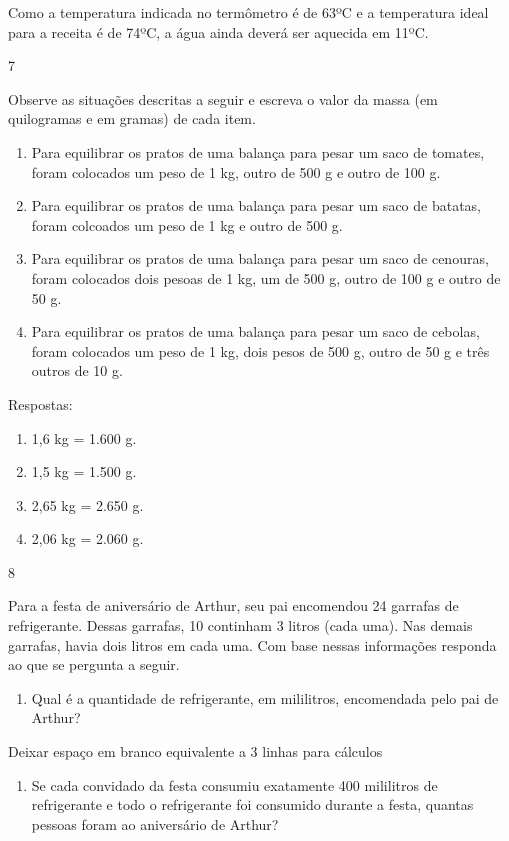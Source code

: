 \begin{mdframed}[linewidth=2pt,linecolor=salmao,roundcorner=2pt]
\begin{itemize}
{\begin{itemize}
\begin{escolha}
Como a temperatura indicada no termômetro é de 63ºC e a temperatura
ideal para a receita é de 74ºC, a água ainda deverá ser aquecida em 11ºC.

\num{7}

Observe as situações descritas a seguir e escreva o valor da massa (em quilogramas e em gramas) de cada item.

\begin{enumerate}
\item
  Para equilibrar os pratos de uma balança para pesar um saco de tomates, foram colocados um peso de 1 kg, outro de 500 g e outro de 100 g.
\item
  Para equilibrar os pratos de uma balança para pesar um saco de batatas, foram colcoados um peso de 1 kg e outro de 500 g.
\item
  Para equilibrar os pratos de uma balança para pesar um saco de cenouras, foram colocados dois pesoas de 1 kg, um de 500 g, outro de 100 g e outro de 50 g.
\item
  Para equilibrar os pratos de uma balança para pesar um saco de cebolas, foram colocados um peso de 1 kg, dois pesos de 500 g, outro de 50 g e três outros de 10 g.
\end{enumerate}

Respostas:

\begin{enumerate}
\item
  1,6 kg = 1.600 g.
\item
  1,5 kg = 1.500 g.
\item
  2,65 kg = 2.650 g.
\item
  2,06 kg = 2.060 g.
\end{enumerate}

\num{8}

Para a festa de aniversário de Arthur, seu pai encomendou 24 garrafas de
refrigerante. Dessas garrafas, 10 continham 3 litros (cada uma). Nas
demais garrafas, havia dois litros em cada uma. Com base nessas
informações responda ao que se pergunta a seguir.

\begin{enumerate}
\item
  Qual é a quantidade de refrigerante, em mililitros, encomendada pelo pai de Arthur?
\end{enumerate}

Deixar espaço em branco equivalente a 3 linhas para cálculos

\begin{enumerate}
\item
  Se cada convidado da festa consumiu exatamente 400 mililitros de refrigerante e
  todo o refrigerante foi consumido durante a festa, quantas pessoas
  foram ao aniversário de Arthur?
\end{enumerate}


\end{escolha}
\end{itemize}}
\end{itemize}
\end{mdframed}
